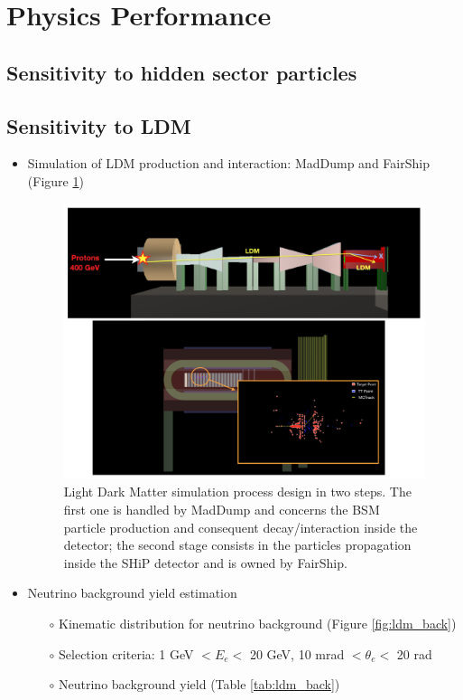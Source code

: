 \section{Physics Performance}
\label{sec{physicsperformance}}

\subsection{Sensitivity to hidden sector particles}

\subsection{Sensitivity to LDM}
\begin{itemize}
    \item Simulation of LDM production and interaction: MadDump and FairShip (Figure \ref{fig:ldm_prod})
    
    \begin{figure}[htbp]
    \centering  
    \includegraphics[scale=0.3]{figs/PhysicsPerformance/LDM_Prod.png}
    \caption{Light Dark Matter simulation process design in two steps. The first one is handled by MadDump and concerns the BSM particle production and consequent decay/interaction inside the detector; the second stage consists in the particles propagation inside the SHiP detector and is owned by FairShip.}
    \label{fig:ldm_prod}
    \end{figure}

    \item Neutrino background yield estimation
    \begin{itemize}
        \item[$\circ$] Kinematic distribution for neutrino background (Figure \ref{fig:ldm_back})
         \item[$\circ$] Selection criteria: 1 GeV $< E_e <$ 20 GeV, 10 mrad $<\theta_e<$ 20 rad
   \item[$\circ$] Neutrino background yield (Table \ref{tab:ldm_back})
    

\end{itemize}
\end{itemize}

